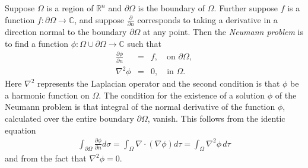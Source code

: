 \documentclass[12pt]{article}
\newcommand{\sR}[0]{\mathbb{R}}
\newcommand{\sC}[0]{\mathbb{C}}
\begin{document}
Suppose $\Omega$ is a region of $\sR^n$ and $\partial\Omega$ is the boundary of $\Omega$. 
Further suppose $f$ is a function $f\colon\partial \Omega\to\sC$, and suppose $\frac{\partial}{\partial n}$ corresponds to taking a derivative in a direction normal to the boundary $\partial\Omega$ at any point.  Then the 
\emph{Neumann problem} is to find a function $\phi\colon \Omega\cup \partial \Omega \to\sC$
such that 
\begin{eqnarray*}
\frac{\partial\phi}{\partial n} &=& f,\quad \text{on $\partial \Omega$}, \\
\nabla^2 \phi &=& 0,\quad \text{in $\Omega$}. 
\end{eqnarray*}
Here $\nabla^2$ represents the Laplacian operator and the second condition is that $\phi$ be a harmonic function on $\Omega$. The condition for the existence of a solution $\phi$ of the Neumann problem is that integral of the normal derivative of the function $\phi$, calculated over the entire boundary $\partial\Omega$, vanish. This follows from the identic equation
\begin{align*}
\int_{\partial\Omega}\frac{\partial\phi}{\partial n}d\sigma=
\int_\Omega\nabla\!\cdot\!(\nabla\phi)d\tau=\int_\Omega\nabla^2\phi\,d\tau
\end{align*}
and from the fact that $\nabla^2\phi=0$.

\end{document}
